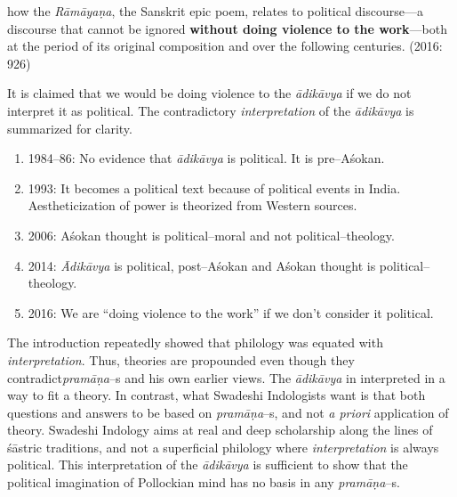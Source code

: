 \newpage

\begin{myquote}
how the \textit{Rāmāyaṇa}, the Sanskrit epic poem, relates to political discourse—a discourse that cannot be ignored \textbf{without doing violence to the work}—both at the period of its original composition and over the following centuries. (2016: 926)
\end{myquote}

It is claimed that we would be doing violence to the \textit{ādikāvya} if we do not interpret it as political. The contradictory \textit{interpretation} of the \textit{ādikāvya }is summarized for clarity.

\begin{enumerate}
\itemsep=0pt
\item 1984–86: No evidence that \textit{ādikāvya }is political. It is pre–Aśokan.

 \item 1993: It becomes a political text because of political events in India. Aestheticization of power is theorized from Western sources.

 \item 2006: Aśokan thought is political–moral and not political–theology.

 \item 2014: \textit{Ādikāvya }is political, post–Aśokan and Aśokan thought is political–theology.

 \item 2016: We are “doing violence to the work” if we don’t consider it political.

\end{enumerate}

The introduction repeatedly showed that philology was equated with \textit{interpretation}. Thus, theories are propounded even though they contradict\textit{pramāṇa}–s and his own earlier views. The\textit{ ādikāvya} in interpreted in a way to fit a theory. In contrast, what Swadeshi Indologists want is that both questions and answers to be based on \textit{pramāṇa}–s, and not \textit{a priori} application of theory. Swadeshi Indology aims at real and deep scholarship along the lines of śāstric traditions, and not a superficial philology where \textit{interpretation} is always political. This interpretation of the \textit{ādikāvya }is sufficient to show that the political imagination of Pollockian mind has no basis in any \textit{pramāṇa}–s.

